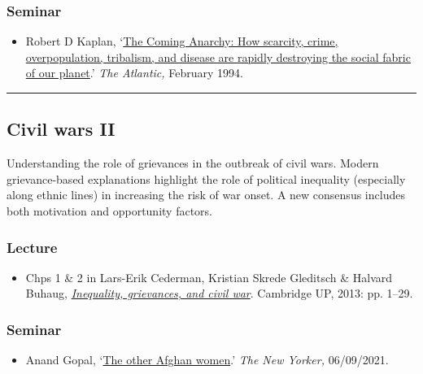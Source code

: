 \documentclass[12pt, a4paper]{article}
\begin{document}
\subsubsection*{Seminar}

\begin{itemize}
\setlength\itemsep{-5pt}
\item Robert D Kaplan, `\href{https://www.theatlantic.com/magazine/archive/1994/02/the-coming-anarchy/304670/}{The Coming Anarchy: How scarcity, crime, overpopulation, tribalism, and disease are rapidly destroying the social fabric of our planet}.' \textit{The Atlantic,} February 1994.
\end{itemize}

\hrule %

\subsection{Civil wars II}

Understanding the role of grievances in the outbreak of civil wars. Modern grievance-based explanations highlight the role of political inequality (especially along ethnic lines) in increasing the risk of war onset. A new consensus includes both motivation and opportunity factors.

\subsubsection*{Lecture}

\begin{itemize}
\setlength\itemsep{0pt}
\item Chps 1 \& 2 in Lars-Erik Cederman, Kristian Skrede Gleditsch \& Halvard Buhaug, \href{https://doi.org/10.1017/CBO9781139084161}{\textit{Inequality, grievances, and civil war}}. Cambridge UP, 2013: pp. 1--29.
\end{itemize}

\subsubsection*{Seminar}

\begin{itemize}
\setlength\itemsep{0pt}
\item Anand Gopal, `\href{https://www.newyorker.com/magazine/2021/09/13/the-other-afghan-women}{The other Afghan women}.' \textit{The New Yorker,} 06/09/2021.
\end{itemize}
\end{document}
